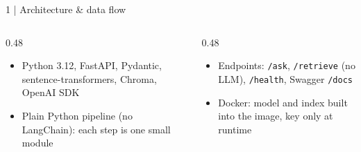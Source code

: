 \documentclass[aspectratio=169,10pt]{beamer}
\newcommand{\code}[1]{\texttt{#1}}
\begin{document}
\begin{frame}{1 \;|\; Architecture \& data flow}
\vspace{1mm}
\begin{columns}[T]
\begin{column}{0.48\textwidth}
\scriptsize
\begin{itemize}
  \item Python 3.12, FastAPI, Pydantic, sentence-transformers, Chroma, OpenAI SDK
  \item Plain Python pipeline (no LangChain): each step is one small module
\end{itemize}
\end{column}
\begin{column}{0.48\textwidth}
\scriptsize
\begin{itemize}
  \item Endpoints: \code{/ask}, \code{/retrieve} (no LLM), \code{/health}, Swagger \code{/docs}
  \item Docker: model and index built into the image, key only at runtime
\end{itemize}
\end{column}
\end{columns}
\end{frame}
\end{document}
